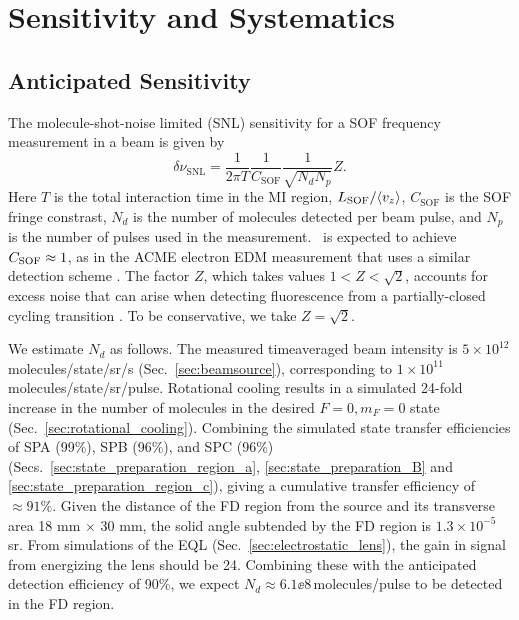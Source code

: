 \section{Sensitivity and Systematics}
\label{sec:sensitivity_and_systematics}

\subsection{Anticipated Sensitivity}

The molecule-shot-noise limited (SNL) sensitivity for a SOF frequency measurement in a beam is given by
\begin{equation}
    \delta \nu_\mathrm{SNL} = \frac{1}{2\pi T}\frac{1}{C_\mathrm{SOF}}\frac{1}{\sqrt{N_d N_p}} Z.
\end{equation}
Here $T$ is the total interaction time in the MI region, $L_{\rm SOF}/\langle v_z\rangle$,
$C_\mathrm{SOF}$ is the SOF fringe constrast, $N_d$ is the number of molecules detected per beam pulse, and $N_p$ is the number of pulses used in the measurement. \CENTREX\ is expected to achieve $C_{\rm SOF} \approx 1$, as in the ACME electron EDM measurement that uses a similar detection scheme \cite{andreev_improved_2018}.  The factor $Z$, which takes values $1\! <\! Z\! < \!\sqrt{2}$, accounts for excess noise that can arise when detecting fluorescence from a partially-closed cycling transition \cite{PhysRevA.98.053823}.  To be conservative, we take $Z=\sqrt{2}$.

We estimate $N_d$ as follows.  The measured time\hyph averaged beam intensity is $5\times 10^{12}\,$molecules/state/sr/s (Sec.\ \ref{sec:beamsource}), corresponding to $1\times 10^{11}\,$molecules/state/sr/pulse. Rotational cooling results in a simulated 24-fold increase in the number of molecules in the desired $F=0,m_F=0$ state (Sec.\ \ref{sec:rotational_cooling}).
Combining the simulated state transfer efficiencies of SPA (99\%), SPB (96\%), and SPC (96\%) (Secs.\ \ref{sec:state_preparation_region_a}, \ref{sec:state_preparation_B} and \ref{sec:state_preparation_region_c}), giving a cumulative transfer efficiency of $\approx 91\%$.  Given the distance of the FD region from the source and its transverse area 18 mm $\times$ 30 mm, the solid angle subtended by the FD region is $1.3\times 10^{-5}\,$sr. From simulations of the EQL (Sec.\ \ref{sec:electrostatic_lens}), the gain in signal from energizing the lens should be 24. Combining these with the anticipated detection efficiency of 90\%, we expect $N_d \approx 6.1\ee{8}\,$molecules/pulse to be detected in the FD region.

